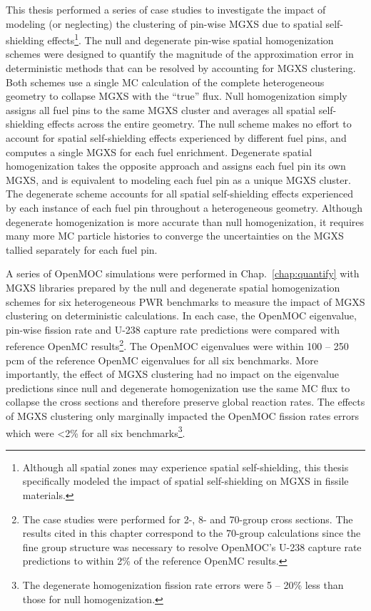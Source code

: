 
This thesis performed a series of case studies to investigate the impact of modeling (or neglecting) the clustering of pin-wise \ac{MGXS} due to spatial self-shielding effects\footnote{Although all spatial zones may experience spatial self-shielding, this thesis specifically modeled the impact of spatial self-shielding on MGXS in fissile materials.}. The null and degenerate pin-wise spatial homogenization schemes were designed to quantify the magnitude of the approximation error in deterministic methods that can be resolved by accounting for \ac{MGXS} clustering. Both schemes use a single \ac{MC} calculation of the complete heterogeneous geometry to collapse MGXS with the ``true'' flux. Null homogenization simply assigns all fuel pins to the same \ac{MGXS} cluster and averages all spatial self-shielding effects across the entire geometry. The null scheme makes no effort to account for spatial self-shielding effects experienced by different fuel pins, and computes a single \ac{MGXS} for each fuel enrichment. Degenerate spatial homogenization takes the opposite approach and assigns each fuel pin its own \ac{MGXS}, and is equivalent to modeling each fuel pin as a unique \ac{MGXS} cluster. The degenerate scheme accounts for all spatial self-shielding effects experienced by each instance of each fuel pin throughout a heterogeneous geometry. Although degenerate homogenization is more accurate than null homogenization, it requires many more \ac{MC} particle histories to converge the uncertainties on the \ac{MGXS} tallied separately for each fuel pin.

A series of OpenMOC simulations were performed in Chap.~\ref{chap:quantify} with \ac{MGXS} libraries prepared by the null and degenerate spatial homogenization schemes for six heterogeneous \ac{PWR} benchmarks to measure the impact of \ac{MGXS} clustering on deterministic calculations. In each case, the OpenMOC eigenvalue, pin-wise fission rate and U-238 capture rate predictions were compared with reference OpenMC results\footnote{The case studies were performed for 2-, 8- and 70-group cross sections. The results cited in this chapter correspond to the 70-group calculations since the fine group structure was necessary to resolve OpenMOC's U-238 capture rate predictions to within 2\% of the reference OpenMC results.}. The OpenMOC eigenvalues were within 100 -- 250 \ac{pcm} of the reference OpenMC eigenvalues for all six benchmarks. More importantly, the effect of \ac{MGXS} clustering had no impact on the eigenvalue predictions since null and degenerate homogenization use the same \ac{MC} flux to collapse the cross sections and therefore preserve global reaction rates. The effects of \ac{MGXS} clustering only marginally impacted the OpenMOC fission rates errors which were <2\% for all six benchmarks\footnote{The degenerate homogenization fission rate errors were 5 -- 20\% less than those for null homogenization.}.

